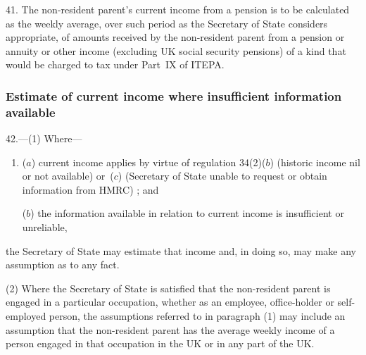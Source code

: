 \documentclass[12pt,a4paper]{article}
\begin{document}
41.  The non-resident parent’s current income from a pension is to be calculated as the weekly average, over such period as the Secretary of State considers appropriate, of amounts received by the non-resident parent from a pension or annuity or other income (excluding UK social security pensions) of a kind that would be charged to tax under Part~IX of ITEPA.

\subsubsection[42. Estimate of current income where insufficient information available]{Estimate of current income where insufficient information available}

42.---(1)  Where—
\begin{enumerate}\item[]
($a$) current income applies by virtue of 
regulation 34(2)($b$)  
(historic income 
nil or  %
not available)
or~($c$)  (Secretary of State unable to request or obtain information from HMRC)%
; and

($b$) the information available in relation to current income is insufficient or unreliable,
\end{enumerate}
the Secretary of State may estimate that income and, in doing so, may make any assumption as to any fact.

(2) Where the Secretary of State is satisfied that the non-resident parent is engaged in a particular occupation, whether as an employee, office-holder or self-employed person, the assumptions referred to in paragraph (1) may include an assumption that the non-resident parent has the average weekly income of a person engaged in that occupation in the UK or in any part of the UK.

\end{document}
